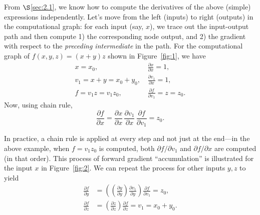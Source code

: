 From $\S$\ref{sec:2.1}, we know how to compute the derivatives of the above (simple) expressions independently. Let's move from the left (inputs) to right (outputs) in the computational graph: for each input (say, $x$), we trace out the input-output path and then compute 1) the corresponding node output, and 2) the gradient with respect to the \textit{preceding intermediate} in the path. For the computational graph of $f(x, y, z) = (x + y) z$ shown in Figure~\ref{fig:1}, we have
\begin{align*}
    x = x_0, &\, \frac{\partial x}{\partial x} = 1, \\
    v_1 = x + y = x_0 + y_0, &\,\frac{\partial v_1}{\partial x} = 1, \\
    f = v_1 z = v_1 z_0, &\,\frac{\partial f}{\partial v_1} = z = z_0.
\end{align*}
Now, using chain rule,
$$
    \frac{\partial f}{\partial x} = \frac{\partial x}{\partial x}\, \frac{\partial v_1}{\partial x}\, \frac{\partial f}{\partial v_1} = z_0.
$$

In practice, a chain rule is applied at every step and not just at the end---in the above example, when $f = v_1z_0$ is computed, both $\partial f / \partial v_1$ and $\partial f / \partial x$ are computed (in that order). This process of forward gradient ``accumulation'' is illustrated for the input $x$ in Figure~\ref{fig:2}. We can repeat the process for other inputs $y, z$ to yield
\begin{align*}
    \frac{\partial f}{\partial y} &= \left(\left(\frac{\partial y}{\partial y}\right) \frac{\partial v_1}{\partial y}\right) \frac{\partial f}{\partial v_1} = z_0, \\
    \frac{\partial f}{\partial z} &= \left(\frac{\partial z}{\partial z}\right) \frac{\partial f}{\partial z} = v_1 = x_0 + y_0.
\end{align*}

